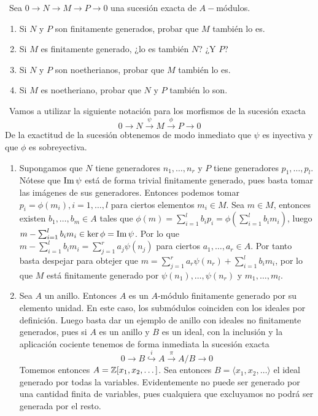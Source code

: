 \documentclass[twoside]{article}
\begin{document}
\begin{solucion}
\end{solucion}
\newpage
\begin{ejercicio}{3}\
Sea $0 \to N \to M \to P \to 0$ una sucesión exacta de $A-$módulos.
\begin{enumerate}
\item Si $N$ y $P$ son finitamente generados, probar que $M$ también lo es.
\item Si $M$ es finitamente generado, ¿lo es también $N$? ¿Y $P$?
\item Si $N$ y $P$ son noetherianos, probar que $M$ también lo es.
\item Si $M$ es noetheriano, probar que $N$ y $P$ también lo son.
\end{enumerate}
\end{ejercicio}
\begin{solucion}\
Vamos a utilizar la siguiente notación para los morfismos de la sucesión exacta $$0\to N  \overset{\psi}{\to} M  \overset{\phi}{\to} P \to 0$$ De la exactitud de la sucesión obtenemos de modo inmediato que $\psi$ es inyectiva y que $\phi$ es sobreyectiva. 
\begin{enumerate}
\item Supongamos que $N$ tiene generadores $n_1,\dots, n_r$ y $P$ tiene generadores $p_1,\dots, p_l$. Nótese que $\operatorname{Im}\psi$ está de forma trivial finitamente generado, pues basta tomar las imágenes de sus generadores. Entonces podemos tomar $p_i=\phi(m_i), i=1,\dots, l$ para ciertos elementos $m_i\in M$. Sea $m\in M$, entonces existen $b_1,\dots, b_m\in A$ tales que $\phi(m)=\sum_{i=1}^lb_ip_i=\phi\left(\sum_{i=1}^lb_im_i\right)$, luego $m-\sum_{i=1}^lb_im_i\in\ker\phi=\operatorname{Im}\psi$. Por lo que $m-\sum_{i=1}^lb_im_i=\sum_{j=1}^r a_j\psi(n_j)$ para ciertos $a_1,\dots,a_r\in A$. Por tanto basta despejar para obtejer que $m=\sum_{j=1}^r a_r\psi(n_r)+\sum_{i=1}^lb_im_i$, por lo que $M$ está finitamente generado por $\psi(n_1),\dots, \psi(n_r)$ y $m_1,\dots, m_l$.

\item Sea $A$ un anillo. Entonces $A$ es un $A$-módulo finitamente generado por su elemento unidad. En este caso, los submódulos coinciden con los ideales por definición. Luego basta dar un ejemplo de anillo con ideales no finitamente generados, pues si $A$ es un anillo y $B$ es un ideal, con la inclusión y la aplicación cociente tenemos de forma inmediata la sucesión exacta
$$0\to B \overset{i}{\hookrightarrow} A\overset{\pi}{\to} A/B\to 0$$
Tomemos entonces $A=\mathbb{Z}[x_1,x_2,\dots]$. Sea entonces $B=\langle x_1,x_2,\dots  \rangle$ el ideal generado por todas la variables. Evidentemente no puede ser generado por una cantidad finita de variables, pues cualquiera que excluyamos no podrá ser generada por el resto. 


\end{enumerate}
\end{solucion}
\end{document}
